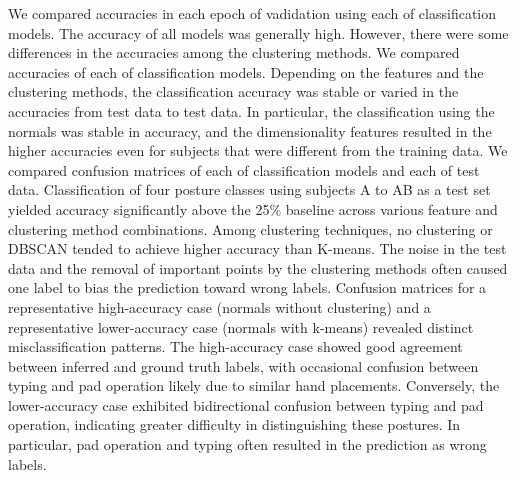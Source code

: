 \begin{deletedblock}
We compared accuracies in each epoch of vadidation using each of classification models. 
    The accuracy of all models was generally high. 
    However, there were some differences in the accuracies among the clustering methods.
We compared accuracies of each of classification models. 
    Depending on the features and the clustering methods, the classification accuracy was stable or varied in the accuracies from test data to test data. 
    In particular, the classification using the normals was stable in accuracy, and the dimensionality features resulted in the higher accuracies even for subjects that were different from the training data. 
We compared confusion matrices of each of classification models and each of test data. 
    Classification of four posture classes using subjects A to AB as a test set yielded accuracy significantly above the 25\% baseline across various feature and clustering method combinations.
    Among clustering techniques, no clustering or DBSCAN tended to achieve higher accuracy than K-means.
    The noise in the test data and the removal of important points by the clustering methods often caused one label to bias the prediction toward wrong labels.
    Confusion matrices for a representative high-accuracy case (normals without clustering) and a representative lower-accuracy case (normals with k-means) revealed distinct misclassification patterns. 
    The high-accuracy case showed good agreement between inferred and ground truth labels, with occasional confusion between typing and pad operation likely due to similar hand placements. 
    Conversely, the lower-accuracy case exhibited bidirectional confusion between typing and pad operation, indicating greater difficulty in distinguishing these postures.
    In particular, pad operation and typing often resulted in the  prediction as wrong labels.
\end{deletedblock}

